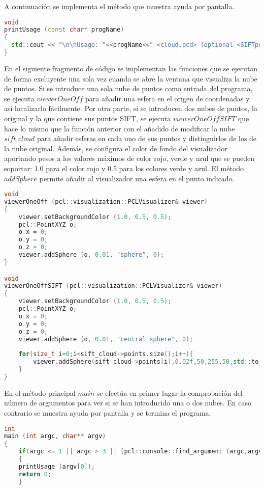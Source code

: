 A continuación se implementa el método que muestra ayuda por pantalla.

\begin{lstlisting}[language=C++,breaklines]
void 
printUsage (const char* progName)
{
  std::cout << "\n\nUsage: "<<progName<<" <cloud.pcd> (optional <SIFTpoints.pcd>)\n\n";
}
\end{lstlisting}

En el siguiente fragmento de código se implementan las funciones que se ejecutan de forma excluyente una sola vez cuando se abre la ventana que visualiza la nube de puntos. 
Si se introduce una sola nube de puntos como entrada del programa, se ejecuta $viewerOneOff$ para añadir una esfera en el origen de coordenadas y así localizarlo fácilmente.
Por otra parte, si se introducen dos nubes de puntos, la original y la que contiene sus puntos SIFT, se ejecuta $viewerOneOffSIFT$ que hace lo mismo que la función anterior con el añadido de modificar la nube $sift\_cloud$ para añadir esferas en cada uno de sus puntos y distinguirlos de los de la nube original.
Además, se configura el color de fondo del visualizador aportando pesos a los valores máximos de color rojo, verde y azul que se pueden soportar: 1.0 para el color rojo y 0.5 para los colores verde y azul. 
El método $addSphere$ permite añadir al visualizador una esfera en el punto indicado.

\begin{lstlisting}[language=C++,breaklines]
void 
viewerOneOff (pcl::visualization::PCLVisualizer& viewer)
{
    viewer.setBackgroundColor (1.0, 0.5, 0.5);
    pcl::PointXYZ o;
    o.x = 0;
    o.y = 0;
    o.z = 0;
    viewer.addSphere (o, 0.01, "sphere", 0); 
}

void 
viewerOneOffSIFT (pcl::visualization::PCLVisualizer& viewer)
{
    viewer.setBackgroundColor (1.0, 0.5, 0.5);
    pcl::PointXYZ o;
    o.x = 0;
    o.y = 0;
    o.z = 0;
    viewer.addSphere (o, 0.01, "central sphere", 0);
    
    for(size_t i=0;i<sift_cloud->points.size();i++){
    	viewer.addSphere(sift_cloud->points[i],0.02f,50,255,50,std::to_string(i));	
    }
}
\end{lstlisting}

En el método principal $main$ se efectúa en primer lugar la comprobación del número de argumentos para ver si se han introducido una o dos nubes. En caso contrario se muestra ayuda por pantalla y se termina el programa.

\begin{lstlisting}[language=C++,breaklines]
int 
main (int argc, char** argv)
{   
    if(argc <= 1 || argc > 3 || (pcl::console::find_argument (argc,argv,"-h")) >= 0 )
    {
	printUsage (argv[0]);
	return 0;
    } 
\end{lstlisting}

